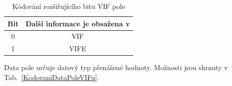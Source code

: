 \begin{table}[!ht]
\centering
\caption{Kódování rozšiřujícího bitu VIF pole}
\label{KodovaniRozsBituVIFu}
\begin{tabular}{|c|c|}
\hline
\textbf{Bit} & \textbf{Další informace je obsažena v} \\ \hline \hline
0            & VIF                                    \\ \hline
1            & VIFE                                   \\ \hline \hline
\end{tabular}
\end{table}

Data pole určuje datový typ přenášené hodnoty. Možnosti jsou shrnuty v Tab.~\ref{KodovaniDataPoleVIFu}.

\begin{table}[!ht]
\centering
\caption{Kódování Data pole VIF pole}
\label{KodovaniDataPoleVIFu}
\end{table}
